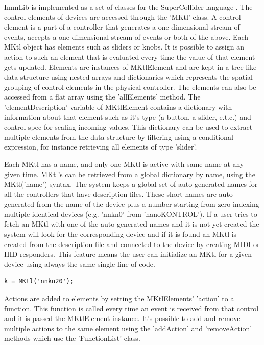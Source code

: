 \documentclass{article}
\begin{document}
ImmLib is implemented as a set of classes for the SuperCollider language \cite{mccartney_rethinking_2002}. The control elements of devices are accessed through the 'MKtl' class. A control element is a part of a controller that generates a one-dimensional stream of events, accepts a one-dimensional stream of events or both of the above. Each MKtl object has elements such as sliders or knobs. It is possible to assign an action to such an element that is evaluated every time the value of that element gets updated. Elements are instances of MKtlElement and are kept in a tree-like data structure using nested arrays and dictionaries which represents the spatial grouping of control elements in the physical controller. The elements can also be accessed from a flat array using the 'allElements' method. The 'elementDescription' variable of MKtlElement contains a dictionary with information about that element such as it's type (a button, a slider, e.t.c.) and control spec for scaling incoming values. This dictionary can be used to extract multiple elements from the data structure by filtering using a conditional expression, for instance retrieving all elements of type 'slider'.

Each MKtl has a name, and only one MKtl is active with same name at any given time. MKtl's can be retrieved from a global dictionary by name, using the MKtl('name') syntax. The system keeps a global set of auto-generated names for all the controllers that have description files. These short names are auto-generated from the name of the device plus a number starting from zero indexing multiple identical devices (e.g. 'nnkn0' from 'nanoKONTROL'). If a user tries to fetch an MKtl with one of the auto-generated names and it is not yet created the system will look for the corresponding device and if it is found an MKtl is created from the description file and connected to the device by creating MIDI or HID responders. This feature means the user can initialize an MKtl for a given device using always the same single line of code.

\begin{Verbatim}
k = MKtl('nnkn20');
\end{Verbatim}

Actions are added to elements by setting the MKtlElements' 'action' to a function. This function is called every time an event is received from that control and it is passed the MKtlElement instance. It's possible to add and remove multiple actions to the same element using the 'addAction' and 'removeAction' methods which use the 'FunctionList' class.
\end{document}
